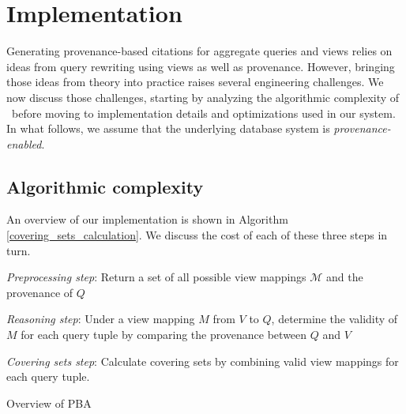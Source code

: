\section{Implementation}\label{Sec: implementation}
Generating provenance-based citations for aggregate queries and views relies on ideas from query rewriting using views as well as provenance. However, bringing those ideas from theory into practice raises several engineering challenges. We now discuss those challenges, starting by analyzing the algorithmic complexity of \provalg\ before moving to
 implementation details and optimizations used in our system.
In what follows, we assume that the underlying database system is \textit{provenance-enabled}.


\subsection{Algorithmic complexity}
 An overview of our implementation is shown in Algorithm \ref{covering_sets_calculation}.  
We discuss the cost of each of these three steps in turn.

\begin{algorithm}[h!] 
\footnotesize


{\em Preprocessing step}: Return a set of all possible view mappings $\mathcal{M}$ and the provenance of $Q$

{\em Reasoning step}: Under a view mapping $M$ from $V$ to $Q$, determine the validity of $M$ for each query tuple by comparing the provenance between $Q$ and $V$

{\em Covering sets step}: Calculate covering sets by combining valid view mappings for each query tuple.
 \caption{Overview of PBA}
 \label{covering_sets_calculation}
 \end{algorithm}


